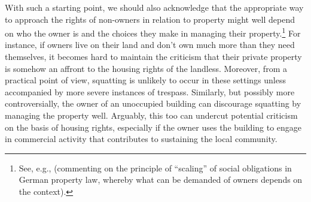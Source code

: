 

With such a starting point, we should also acknowledge that the appropriate way to approach the rights of non-owners in relation to property might well depend on who the owner is and the choices they make in managing their property.\footnote{See, e.g., \cite[43]{walt11} (commenting on the principle of ``scaling'' of social obligations in German property law, whereby what can be demanded of owners depends on the context).} For instance, if owners live on their land and don't own much more than they need themselves, it becomes hard to maintain the criticism that their private property is somehow an affront to the housing rights of the landless. Moreover, from a practical point of view, squatting is unlikely to occur in these settings unless accompanied by more severe instances of trespass. Similarly, but possibly more controversially, the owner of an unoccupied building can discourage squatting by managing the property well. Arguably, this too can undercut potential criticism on the basis of housing rights, especially if the owner uses the building to engage in commercial activity that contributes to sustaining the local community.

